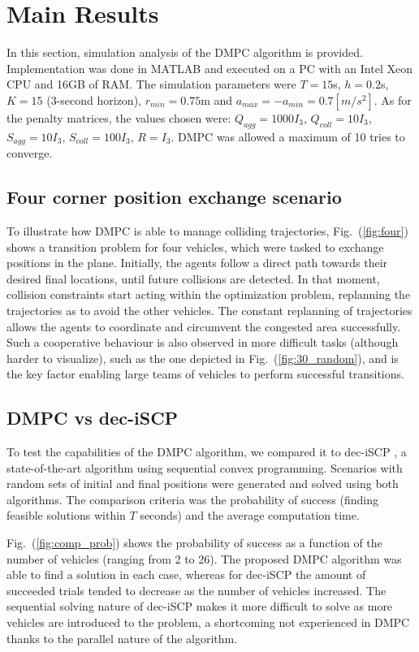 \section{Main Results}
\label{sec:results}

In this section, simulation analysis of the DMPC algorithm is provided. Implementation was done in MATLAB and executed on a PC with an Intel Xeon CPU and 16GB of RAM. The simulation parameters were $T = 15$s, $h = 0.2$s, $K = 15$ (3-second horizon), $r_{min} = 0.75$m and $a_{max} = -a_{min} = 0.7 [m/s^2]$. As for the penalty matrices, the values chosen were: $Q_{agg} = 1000I_3$, $Q_{coll} = 10I_3$, $S_{agg} = 10I_3$, $S_{coll} = 100I_3$, $R = I_3$. DMPC was allowed a maximum of 10 tries to converge.

\subsection{Four corner position exchange scenario}
To illustrate how DMPC is able to manage colliding trajectories, Fig.~(\ref{fig:four}) shows a transition problem for four vehicles, which were tasked to exchange positions in the plane. Initially, the agents follow a direct path towards their desired final locations, until future collisions are detected. In that moment, collision constraints start acting within the optimization problem, replanning the trajectories as to avoid the other vehicles. The constant replanning of trajectories allows the agents to coordinate and circumvent the congested area successfully. Such a cooperative behaviour is also observed in more difficult tasks (although harder to visualize), such as the one depicted in Fig.~(\ref{fig:30_random}), and is the key factor enabling large teams of vehicles to perform successful transitions.


\subsection{DMPC vs dec-iSCP}
To test the capabilities of the DMPC algorithm, we compared it to dec-iSCP \cite{chen2015decoupled}, a state-of-the-art algorithm using sequential convex programming. Scenarios with random sets of initial and final positions were generated and solved using both algorithms. The comparison criteria was the probability of success (finding feasible solutions within $T$ seconds) and the average computation time.

Fig.~(\ref{fig:comp_prob}) shows the probability of success as a function of the number of vehicles (ranging from 2 to 26). The proposed DMPC algorithm was able to find a solution in each case, whereas for dec-iSCP the amount of succeeded trials tended to decrease as the number of vehicles increased. The sequential solving nature of dec-iSCP makes it more difficult to solve as more vehicles are introduced to the problem, a shortcoming not experienced in DMPC thanks to the parallel nature of the algorithm.

